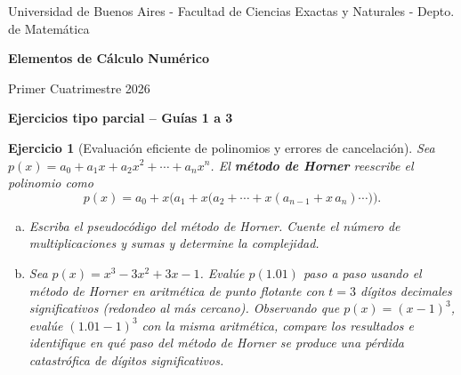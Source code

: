 \documentclass[12pt]{article}
\newtheorem{exercise}{Ejercicio}
\begin{document}
\centerline{{\small Universidad de Buenos Aires - Facultad de Ciencias Exactas y Naturales - Depto. de Matemática}}
 
 \vskip 0.2cm
 \hrulefill
 \vskip 0.2cm

 \centerline{{\bf\Huge {\sc Elementos de Cálculo Numérico}}}
 \vskip 0.2cm
 \centerline{\ttfamily Primer Cuatrimestre 2026}
 \hrulefill

 \bigskip
 \centerline{\bf Ejercicios tipo parcial -- Guías 1 a 3}
 \bigskip


\begin{exercise}[Evaluación eficiente de polinomios y errores de cancelación]
Sea $p(x) = a_0 + a_1 x + a_2 x^2 + \cdots + a_n x^n$. El \textbf{método de Horner} reescribe el polinomio como
\[
p(x) = a_0 + x\bigl(a_1 + x\bigl(a_2 + \cdots + x(a_{n-1} + x\,a_n)\cdots\bigr)\bigr).
\]

\begin{enumerate}[(a)]
\item Escriba el pseudocódigo del método de Horner. Cuente el número de multiplicaciones y sumas y determine la complejidad. 

\item Sea $p(x) = x^3 - 3x^2 + 3x - 1$. Evalúe $p(1.01)$ paso a paso usando el método de Horner en aritmética de punto flotante con $t = 3$ dígitos decimales significativos (redondeo al más cercano). Observando que $p(x) = (x-1)^3$, evalúe $(1.01-1)^3$ con la misma aritmética, compare los resultados e identifique en qué paso del método de Horner se produce una pérdida catastrófica de dígitos significativos.
\end{enumerate}
\end{exercise}


\end{document}
